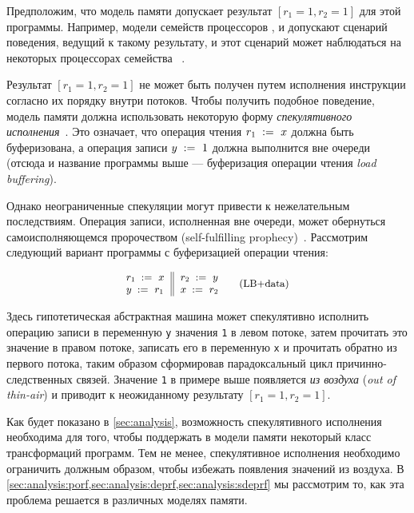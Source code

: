 Предположим, что модель памяти допускает 
результат ${[r_1=1, r_2=1]}$ для этой программы. 
Например, модели семейств процессоров 
,  и \POWER
допускают  сценарий поведения, ведущий к такому результату, 
и этот сценарий может наблюдаться на некоторых процессорах семейства 
~\cite{Maranget-al:Tutorial2012}.

Результат ${[r_1=1, r_2=1]}$ не может быть получен 
путем исполнения инструкции согласно их порядку внутри потоков.
Чтобы получить подобное поведение, 
модель памяти должна  использовать 
некоторую форму \emph{спекулятивного исполнения}~\cite{Boudol-Petri:ESOP10, Boehm-Demsky:MSPC14}.
Это означает, что  операция чтения $r_1\;:=_{}\;x$
должна быть буферизована, а операция записи $y\;:=_{}\;1$ 
должна выполнится вне очереди 
(отсюда и название программы выше --- 
буферизация операции чтения \emph{load buffering}).

Однако неограниченные спекуляции могут привести 
к нежелательным последствиям. 
Операция записи, исполненная вне очереди, может обернуться
самоисполняющемся пророчеством (self-fulfilling prophecy)~\cite{Boehm-Demsky:MSPC14}. 
Рассмотрим следующий вариант программы с буферизацией операции чтения:

\begin{equation*}
\small
\inarrII{
  \readInst{}{r_1}{x}   \\
  \writeInst{}{y}{r_1}  \\
}{
  \readInst{}{r_2}{y}   \\
  \writeInst{}{x}{r_2}  \\
}
\tag{LB+data}\label{ex:lb+data}
\end{equation*}

Здесь гипотетическая абстрактная машина 
может спекулятивно исполнить операцию записи в переменную \texttt{y}
значения \texttt{1} в левом потоке, 
затем прочитать это значение в правом потоке, 
записать его в переменную \texttt{x} и прочитать обратно из 
первого потока, таким образом сформировав парадоксальный цикл 
причинно-следственных связей.  
Значение \texttt{1} в примере выше появляется \emph{из воздуха}
(\emph{out of thin-air}) и приводит 
к неожиданному результату ${[r_1=1, r_2=1]}$.

Как будет показано в \cref{sec:analysis},
возможность спекулятивного исполнения необходима для того, чтобы 
поддержать в модели памяти некоторый класс трансформаций программ. 
Тем не менее, спекулятивное исполнения необходимо 
ограничить должным образом, чтобы избежать 
появления значений из воздуха. 
В \cref{sec:analysis:porf,sec:analysis:deprf,sec:analysis:sdeprf}
мы рассмотрим то, как эта проблема решается в различных моделях памяти. 
